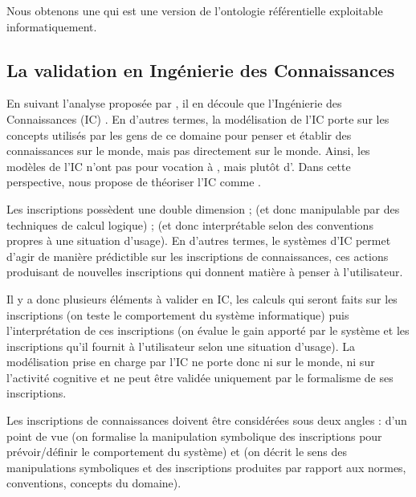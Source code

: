 Nous obtenons une  qui est une version de l'ontologie référentielle exploitable informatiquement.





\subsection{La validation en Ingénierie des Connaissances}\label{sec:valid-ic}
En suivant l'analyse proposée par \cite{Bachimont2004}, il en découle que  l'Ingénierie des Connaissances (IC) . 
En d'autres termes, la modélisation de l'IC porte sur les concepts utilisés par les gens de ce domaine pour penser et établir des connaissances sur le monde, mais pas directement sur le monde.
Ainsi, les modèles de l'IC n'ont pas pour vocation à , mais plutôt d'. 
Dans cette perspective, \citeauthor{Bachimont2004} nous propose de théoriser l'IC comme . 
        
Les inscriptions possèdent une double dimension ;  (et donc manipulable par des techniques de calcul logique) ;  (et donc interprétable selon des conventions propres à une situation d'usage).  
En d'autres termes, le systèmes d'IC permet d'agir de manière prédictible sur les inscriptions de connaissances, ces actions produisant de nouvelles inscriptions qui donnent matière à penser à l'utilisateur. 
        
Il y a donc plusieurs éléments à valider en IC, les calculs qui seront faits sur les inscriptions (on teste le comportement du système informatique) puis l'interprétation de ces inscriptions (on évalue le gain apporté par le système et les inscriptions qu'il fournit à l'utilisateur selon une situation d'usage). 
La modélisation prise en charge par l'IC ne porte donc ni sur le monde, ni sur l'activité cognitive et ne peut être validée uniquement par le formalisme de ses inscriptions. 
        
Les inscriptions de connaissances doivent être considérées sous deux angles : d'un point de vue  (on formalise la manipulation symbolique des inscriptions pour prévoir/définir le comportement du système) et  (on décrit le sens des manipulations symboliques et des inscriptions produites par rapport aux normes, conventions, concepts du domaine).



